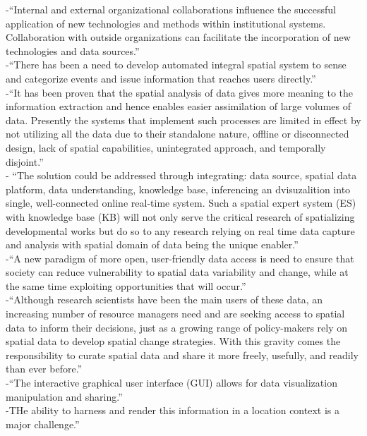 -{\color{orange}“Internal and external organizational collaborations influence the successful application of new technologies and methods within institutional systems. Collaboration with outside organizations can facilitate the incorporation of new technologies and data sources.”}\cite{Afzalan2017}\\
-{\color{orange}“There has been a need to develop automated integral spatial system to sense and categorize events and issue information that reaches users directly.”}\\
-{\color{orange}“It has been proven that the spatial analysis of data gives more meaning to the information extraction and hence enables easier assimilation of large volumes of data. Presently the systems that implement such processes are limited in effect by not utilizing all the data due to their standalone nature, offline or disconnected design, lack of spatial capabilities, unintegrated approach, and temporally disjoint.”}\cite{Bhattacharya2018}\\
-{\color{orange} “The solution could be addressed through integrating: data source, spatial data platform, data understanding, knowledge base, inferencing an dvisuzalition into single, well-connected online real-time system.  Such a spatial expert system (ES) with knowledge base (KB) will not only serve the critical research of spatializing developmental works but do so to any research relying on real time data capture and analysis with spatial domain of data being the unique enabler.”}\cite{Bhattacharya2018}\\
-{\color{orange}“A new paradigm of more open, user-friendly data access is need to ensure that society can reduce vulnerability to spatial data variability and change, while at the same time exploiting opportunities that will occur.”}\cite{Bhattacharya2018}\\
-{\color{orange}“Although research scientists have been the main users of these data, an increasing number of resource managers need and are seeking access to spatial data to inform their decisions, just as a growing range of policy-makers rely on spatial data to develop spatial change strategies. With this gravity comes the responsibility to curate spatial data and share it more freely, usefully, and readily than ever before.”}\cite{Bhattacharya2018}\\%
-{\color{orange}“The interactive graphical user interface (GUI) allows for data visualization manipulation and sharing.”}\cite{Bhattacharya2018}\\
-{\color{orange}THe ability to harness and render this information in a location context is a major challenge.”}\cite{Bhattacharya2018}\\
